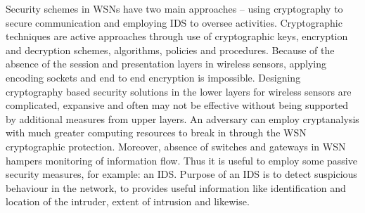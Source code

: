 \documentclass[conference]{IEEEtran}
\newcommand{\notedme}[1]{\raisebox{0pt}[0pt][0pt]{\pdfcomment[open=true,color=blue]{#1}}}
\begin{document}
Security schemes in WSNs have two main approaches -- using cryptography to secure communication and  employing IDS to oversee activities.
Cryptographic techniques are active approaches through use of cryptographic keys, encryption and decryption schemes, algorithms, policies and procedures.
Because  of the absence of the session and presentation layers in wireless sensors, applying encoding sockets and end to end encryption is impossible.
Designing cryptography based security solutions in the lower layers for wireless sensors are complicated, expansive and often may not be effective without being supported by additional measures from upper layers.
An adversary can employ cryptanalysis with much greater computing resources to break in through the WSN cryptographic protection.
Moreover, absence of switches and gateways in WSN hampers monitoring of information flow.
Thus it is useful to employ some passive security measures, for example: an IDS.
Purpose of an IDS is to detect suspicious behaviour in the network, to provides useful information like identification and location of the intruder, extent of intrusion and likewise.
\end{document}
